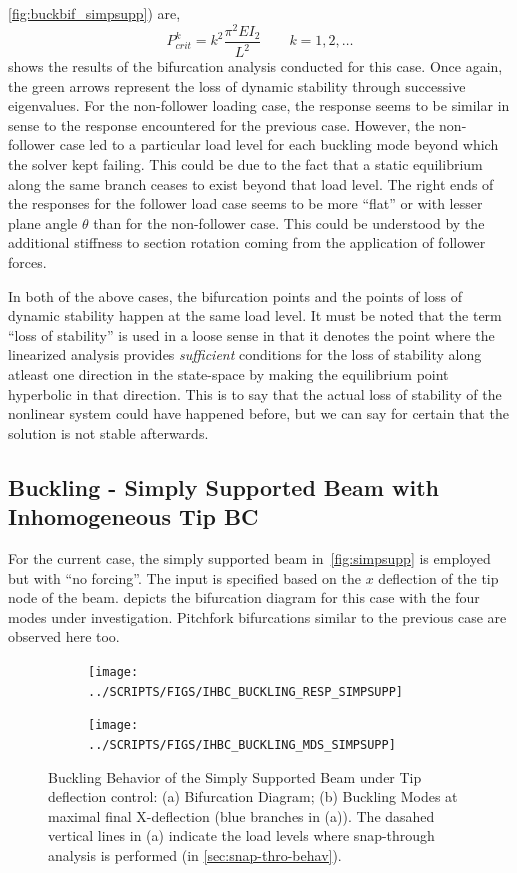 \documentclass[10pt]{article}
\begin{document}
\cref{fig:buckbif_simpsupp}) are,
$$ P_{crit}^k = k^2\frac{\pi^2EI_2}{L^2} \qquad k=1, 2, \dots $$
 shows the results of the bifurcation
analysis conducted for this case. Once again, the green arrows
represent the loss of dynamic stability through successive
eigenvalues. For the non-follower loading case,
the response seems to be similar in sense to the response encountered
for the previous case. However, the non-follower case led to a
particular load level for each buckling mode beyond which the solver
kept failing. This could be due to the fact that a static equilibrium
along the same branch ceases to exist beyond that load level. The
right ends of the responses for the follower load case seems to be
more ``flat'' or with lesser plane angle $\theta$ than for the
non-follower case. This could be understood by the additional
stiffness to section rotation coming from the application of follower
forces.

In both of the above cases, the bifurcation points and the points of
loss of dynamic stability happen at the same load level. It must be
noted that the term ``loss of stability'' is used in a loose sense in
that it denotes the point where the linearized analysis provides
\emph{sufficient} conditions for the loss of stability along atleast
one direction in the state-space by making the equilibrium point
hyperbolic in that direction. This is to say that the actual loss of
stability of the nonlinear system could have happened before, but we
can say for certain that the solution is not stable afterwards.

\pagebreak
\subsection{Buckling - Simply Supported Beam with Inhomogeneous Tip
  BC}
\label{sec:buckl-simply-supp-1}

For the current case, the simply supported beam in~\cref{fig:simpsupp}
is employed but with ``no forcing''. The input is specified based on
the $x$ deflection of the tip node of the
beam.  depicts the bifurcation diagram
for this case with the four modes under investigation. Pitchfork
bifurcations similar to the previous case are observed here too.

\begin{figure}[!h]
  \centering
  \begin{subfigure}[!h]{0.5\linewidth}
    \texttt{[image: ../SCRIPTS/FIGS/IHBC\_BUCKLING\_RESP\_SIMPSUPP]}
    \caption{}
  \end{subfigure}%
  \begin{subfigure}[!h]{0.5\linewidth}
    \texttt{[image: ../SCRIPTS/FIGS/IHBC\_BUCKLING\_MDS\_SIMPSUPP]}
    \caption{}
  \end{subfigure}
  \caption{Buckling Behavior of the Simply Supported Beam under Tip
    deflection control: (a) Bifurcation Diagram; (b) Buckling Modes at
  maximal final X-deflection (blue branches in (a)). The dasahed
  vertical lines in (a) indicate the load levels where snap-through
  analysis is performed (in \cref{sec:snap-thro-behav}).}
  \label{fig:tipdefcsimpsuppbuck}
\end{figure}
\end{document}
